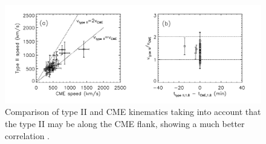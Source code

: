 \begin{figure}[h!]
\begin{center}
\includegraphics[trim=2cm 0cm 0cm 0cm, scale=0.45]{images/mancuso_kins2}
\caption[Comparison of CME and type II height-time kinematics, corrected for CME flank shock assumption]{Comparison of type II and CME kinematics taking into account that the type II may be along the CME flank, showing a much better correlation \citep{mancuso2004}.}
\label{fig:mancuso_kins}
\end{center}
\end{figure}

